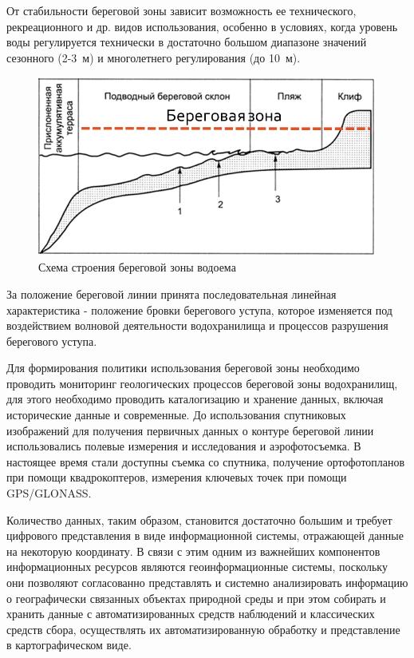 \documentclass[732,fontsize=14pt,final]{studrep}
\begin{document}
От стабильности береговой зоны зависит возможность ее технического, рекреационного и др. видов использования, особенно в условиях, когда уровень воды регулируется технически в достаточно большом диапазоне значений сезонного (2-3~м) и многолетнего регулирования (до 10~м).

  \begin{figure}[htp]
	\centering
    \includegraphics[width=\linewidth]{pics/image1.png}
    \caption{Схема строения береговой зоны водоема}
    \label{fig:shore-schema}
  \end{figure}

За положение береговой линии принята последовательная линейная характеристика - положение бровки берегового уступа, которое изменяется под воздействием волновой деятельности водохранилища и процессов разрушения берегового уступа.

Для формирования политики использования береговой зоны необходимо проводить мониторинг геологических процессов береговой зоны водохранилищ, для этого необходимо проводить каталогизацию и хранение данных, включая исторические данные и современные. До использования спутниковых изображений для получения первичных данных о контуре береговой линии использовались полевые измерения и исследования и аэрофотосъемка. В настоящее время стали доступны съемка со спутника, получение ортофотопланов при помощи квадрокоптеров, измерения ключевых точек при помощи GPS/GLONASS.

Количество данных, таким образом, становится достаточно большим и требует цифрового представления в виде информационной системы, отражающей данные на некоторую координату. В связи с этим одним из важнейших компонентов информационных ресурсов являются геоинформационные системы, поскольку они позволяют согласованно представлять и системно анализировать информацию о географически связанных объектах природной среды и при этом собирать и хранить данные с автоматизированных средств наблюдений и классических средств сбора, осуществлять их автоматизированную обработку и представление в картографическом виде.
\end{document}
